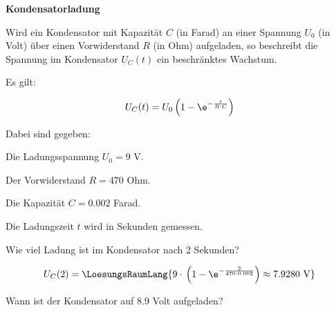 \platzFuerBerechnungenBisEndeSeite{}




\bbwActAufgabenNr{} \textbf{Kondensatorladung}\par
Wird ein Kondensator mit Kapazität $C$ (in Farad) an einer Spannung
$U_0$ (in Volt) über einen Vorwiderstand $R$ (in Ohm) aufgeladen, so
beschreibt die Spannung im Kondensator $U_C(t)$ ein beschränktes
Wachstum.

Es gilt:

$$U_C(t) = U_0\left(1-\e^{-\frac{t}{R\cdot{}C}}\right)$$

Dabei sind gegeben:

Die Ladungsspannung $U_0 = 9$ V.

Der Vorwiderstand $R = 470$ Ohm.

Die Kapazität $C = 0.002$ Farad.

Die Ladungszeit $t$ wird in Sekunden gemessen.

\begin{bbwAufgabenBlock}
\item Wie viel Ladung ist im Kondensator nach 2 Sekunden?

  $$U_C(2) =
  \LoesungsRaumLang{9\cdot{}\left(1-\e^{-\frac{2}{470\cdot{}0.002}}\right)\approx
  7.9280 \textrm{ V}}$$

\item Wann ist der Kondensator auf 8.9 Volt aufgeladen?

  
\end{bbwAufgabenBlock}

\platzFuerBerechnungenBisEndeSeite{}



\newpage

